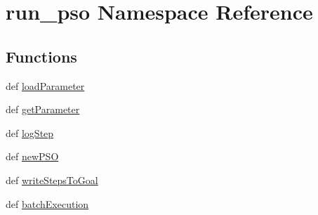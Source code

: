 \hypertarget{namespacerun__pso}{
\section{run\_\-pso Namespace Reference}
\label{namespacerun__pso}
}


\subsection*{Functions}
\begin{CompactItemize}
\item 
def \hyperlink{namespacerun__pso_b5e79fe0acdb6ad14ee29f1b773b2e42}{loadParameter}
\item 
def \hyperlink{namespacerun__pso_84392595c0c0714134b84736072a2c8c}{getParameter}
\item 
def \hyperlink{namespacerun__pso_4471c9ccd03dda5e24d1b11ff2431154}{logStep}
\item 
def \hyperlink{namespacerun__pso_2ec844ebf0526db2fa3f2445a6ac1511}{newPSO}
\item 
def \hyperlink{namespacerun__pso_3cac3122694e2c354f88c9321edcb21f}{writeStepsToGoal}
\item 
def \hyperlink{namespacerun__pso_6d7c6c31447f5d6497091e17995130e0}{batchExecution}
\end{CompactItemize}
